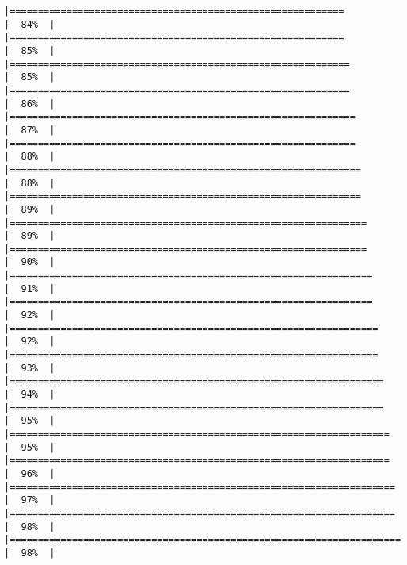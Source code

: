 \documentclass[
]{book}
\begin{document}
\begin{verbatim}
|===========================================================           |  84%  |                                                                              |===========================================================           |  85%  |                                                                              |============================================================          |  85%  |                                                                              |============================================================          |  86%  |                                                                              |=============================================================         |  87%  |                                                                              |=============================================================         |  88%  |                                                                              |==============================================================        |  88%  |                                                                              |==============================================================        |  89%  |                                                                              |===============================================================       |  89%  |                                                                              |===============================================================       |  90%  |                                                                              |================================================================      |  91%  |                                                                              |================================================================      |  92%  |                                                                              |=================================================================     |  92%  |                                                                              |=================================================================     |  93%  |                                                                              |==================================================================    |  94%  |                                                                              |==================================================================    |  95%  |                                                                              |===================================================================   |  95%  |                                                                              |===================================================================   |  96%  |                                                                              |====================================================================  |  97%  |                                                                              |====================================================================  |  98%  |                                                                              |===================================================================== |  98%  |                                                                              
\end{verbatim}
\end{document}
